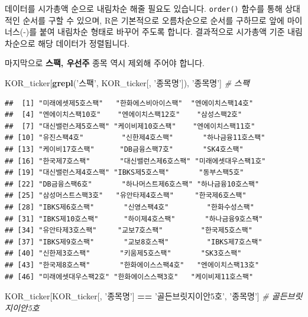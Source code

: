\documentclass[]{book}
\newenvironment{Shaded}{\begin{snugshade}}{\end{snugshade}}
\newcommand{\CommentTok}[1]{\textcolor[rgb]{0.56,0.35,0.01}{\textit{#1}}}
\newcommand{\KeywordTok}[1]{\textcolor[rgb]{0.13,0.29,0.53}{\textbf{#1}}}
\newcommand{\NormalTok}[1]{#1}
\newcommand{\OperatorTok}[1]{\textcolor[rgb]{0.81,0.36,0.00}{\textbf{#1}}}
\newcommand{\StringTok}[1]{\textcolor[rgb]{0.31,0.60,0.02}{#1}}
\begin{document}
데이터를 시가총액 순으로 내림차순 해줄 필요도 있습니다. \texttt{order()} 함수를 통해 상대적인 순서를 구할 수 있으며, R은 기본적으로 오름차순으로 순서를 구하므로 앞에 마이너스(-)를 붙여 내림차순 형태로 바꾸어 주도록 합니다. 결과적으로 시가총액 기준 내림차순으로 해당 데이터가 정렬됩니다.

마지막으로 \textbf{스팩, 우선주} 종목 역시 제외해 주어야 합니다.

\begin{Shaded}
\begin{Highlighting}[]
\NormalTok{KOR_ticker[}\KeywordTok{grepl}\NormalTok{(}\StringTok{'스팩'}\NormalTok{, KOR_ticker[, }\StringTok{'종목명'}\NormalTok{]), }\StringTok{'종목명'}\NormalTok{]  }\CommentTok{# 스팩}
\end{Highlighting}
\end{Shaded}

\begin{verbatim}
##  [1] "미래에셋제5호스팩"   "한화에스비아이스팩"  "엔에이치스팩14호"   
##  [4] "엔에이치스팩10호"    "엔에이치스팩12호"    "삼성스팩2호"        
##  [7] "대신밸런스제5호스팩" "케이비제10호스팩"    "엔에이치스팩11호"   
## [10] "유진스팩4호"         "신한제4호스팩"       "하나금융11호스팩"   
## [13] "케이비17호스팩"      "DB금융스팩7호"       "SK4호스팩"          
## [16] "한국제7호스팩"       "대신밸런스제6호스팩" "미래에셋대우스팩1호"
## [19] "대신밸런스제4호스팩" "IBKS제5호스팩"       "동부스팩5호"        
## [22] "DB금융스팩6호"       "하나머스트제6호스팩" "하나금융10호스팩"   
## [25] "삼성머스트스팩3호"   "유안타제4호스팩"     "한국제6호스팩"      
## [28] "IBKS제6호스팩"       "신영스팩4호"         "한화수성스팩"       
## [31] "IBKS제10호스팩"      "하이제4호스팩"       "하나금융9호스팩"    
## [34] "유안타제3호스팩"     "교보7호스팩"         "한국제5호스팩"      
## [37] "IBKS제9호스팩"       "교보8호스팩"         "IBKS제7호스팩"      
## [40] "신한제3호스팩"       "키움제5호스팩"       "SK3호스팩"          
## [43] "한국제8호스팩"       "한화에이스스팩4호"   "엔에이치스팩13호"   
## [46] "미래에셋대우스팩2호" "한화에이스스팩3호"   "케이비제11호스팩"
\end{verbatim}

\begin{Shaded}
\begin{Highlighting}[]
\NormalTok{KOR_ticker[KOR_ticker[, }\StringTok{'종목명'}\NormalTok{] }\OperatorTok{==}\StringTok{ '골든브릿지이안5호'}\NormalTok{, }\StringTok{'종목명'}\NormalTok{] }\CommentTok{# 골든브릿지이안5호}
\end{Highlighting}
\end{Shaded}
\end{document}
